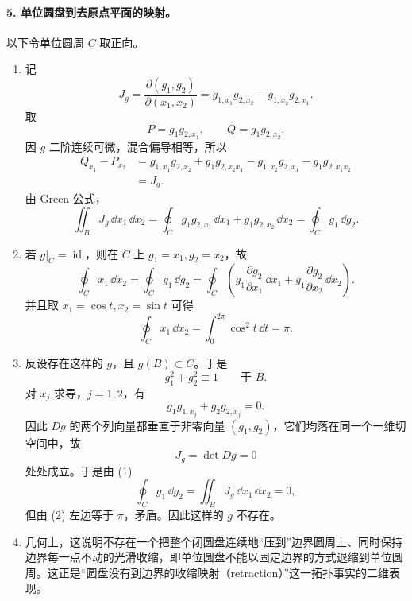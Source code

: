 \paragraph{5. 单位圆盘到去原点平面的映射。}
\begin{xsolution}
以下令单位圆周 $C$ 取正向。
\begin{enumerate}[label=(\arabic*)]
\item 记
\[
  J_g=\frac{\partial(g_1,g_2)}{\partial(x_1,x_2)}
  =g_{1,x_1}g_{2,x_2}-g_{1,x_2}g_{2,x_1}.
\]
取
\[
  P=g_1g_{2,x_1},
  \qquad Q=g_1g_{2,x_2}.
\]
因 $g$ 二阶连续可微，混合偏导相等，所以
\begin{align*}
  Q_{x_1}-P_{x_2}
  &=g_{1,x_1}g_{2,x_2}+g_1g_{2,x_2x_1}
    -g_{1,x_2}g_{2,x_1}-g_1g_{2,x_1x_2}\\
  &=J_g.
\end{align*}
由 Green 公式，
\[
  \iint_BJ_g\,\dd x_1\,\dd x_2
  =\oint_Cg_1g_{2,x_1}\,\dd x_1
   +g_1g_{2,x_2}\,\dd x_2
  =\oint_Cg_1\,\dd g_2.
\]

\item 若 $g|_C=\operatorname{id}$，则在 $C$ 上 $g_1=x_1,g_2=x_2$，故
\[
  \oint_Cx_1\,\dd x_2
  =\oint_Cg_1\,\dd g_2
  =\oint_C\left(
    g_1\frac{\partial g_2}{\partial x_1}\,\dd x_1
    +g_1\frac{\partial g_2}{\partial x_2}\,\dd x_2
  \right).
\]
并且取 $x_1=\cos t,x_2=\sin t$ 可得
\[
  \oint_Cx_1\,\dd x_2=\int_0^{2\pi}\cos^2t\,\dd t=\pi.
\]

\item 反设存在这样的 $g$，且 $g(B)\subset C$。于是
\[
  g_1^2+g_2^2\equiv1\qquad\text{于 }B.
\]
对 $x_j$ 求导，$j=1,2$，有
\[
  g_1g_{1,x_j}+g_2g_{2,x_j}=0.
\]
因此 $Dg$ 的两个列向量都垂直于非零向量 $(g_1,g_2)$，它们均落在同一个一维切空间中，故
\[
  J_g=\det Dg=0
\]
处处成立。于是由 (1)
\[
  \oint_Cg_1\,\dd g_2=\iint_BJ_g\,\dd x_1\,\dd x_2=0,
\]
但由 (2) 左边等于 $\pi$，矛盾。因此这样的 $g$ 不存在。

\item 几何上，这说明不存在一个把整个闭圆盘连续地“压到”边界圆周上、同时保持边界每一点不动的光滑收缩，即单位圆盘不能以固定边界的方式退缩到单位圆周。这正是“圆盘没有到边界的收缩映射（retraction）”这一拓扑事实的二维表现。
\end{enumerate}
\end{xsolution}


